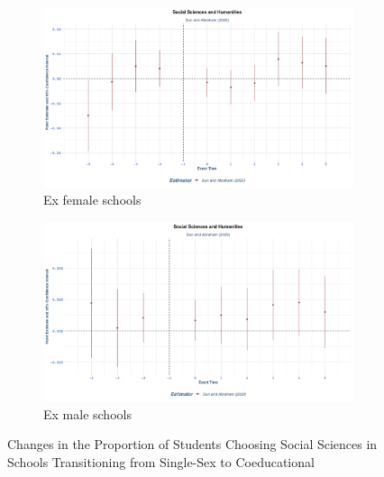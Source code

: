 \begin{figure}[H]
    \centering
    \begin{subfigure}[b]{0.45\textwidth}
        \centering
        \includegraphics[width=\textwidth]{Graph/Results/stagered_ex_females_SOCIAL_SCIENCES_HUMANITIES.png}
        \caption{Ex female schools}
        \label{fig:staggered_females_social_sciences_humanities}
    \end{subfigure}
    \hfill
    \begin{subfigure}[b]{0.45\textwidth}
        \centering
        \includegraphics[width=\textwidth]{Graph/Results/stagered_ex_males_SOCIAL_SCIENCES_HUMANITIES.png}
        \caption{Ex male schools}
        \label{fig:staggered_males_social_sciences_humanities}
    \end{subfigure}
   \caption{ Changes in the Proportion of Students Choosing Social Sciences   in Schools Transitioning from Single-Sex to Coeducational}
    \label{fig:staggered_social_sciences_humanities}
\end{figure}


